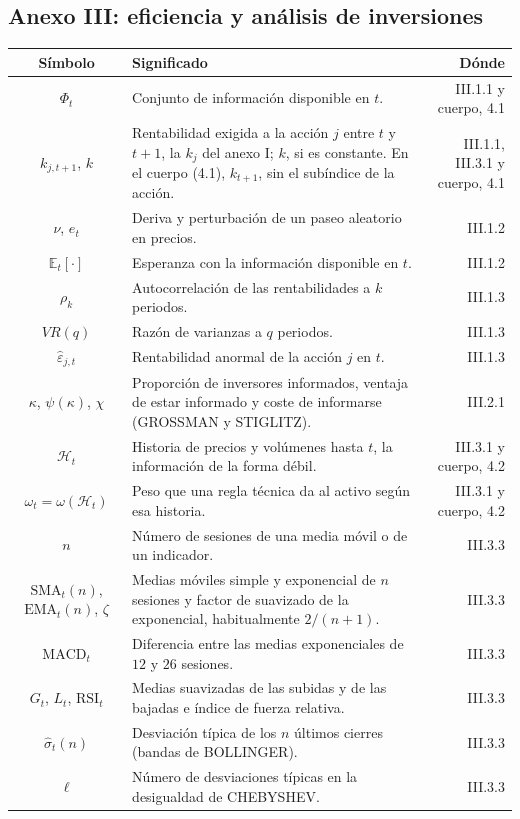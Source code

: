 \documentclass[10pt,a4paper]{article}
\newcommand{\cabecera}{\toprule\textbf{Símbolo} & \textbf{Significado} & \textbf{Dónde}\\\midrule\endhead\bottomrule\endfoot}
\begin{document}
\subsection*{Anexo III: eficiencia y análisis de inversiones}
\begin{longtable}{SMD}
\cabecera
$\Phi_t$ & Conjunto de información disponible en $t$. & III.1.1 y cuerpo, 4.1\\
$k_{j,t+1}$, $k$ & Rentabilidad exigida a la acción $j$ entre $t$ y $t+1$, la $k_j$ del anexo I; $k$, si es constante. En el cuerpo (4.1), $k_{t+1}$, sin el subíndice de la acción. & III.1.1, III.3.1 y cuerpo, 4.1\\
$\nu$, $e_t$ & Deriva y perturbación de un paseo aleatorio en precios. & III.1.2\\
$\mathbb E_t[\cdot]$ & Esperanza con la información disponible en $t$. & III.1.2\\
$\rho_k$ & Autocorrelación de las rentabilidades a $k$ periodos. & III.1.3\\
$VR(q)$ & Razón de varianzas a $q$ periodos. & III.1.3\\
$\hat\varepsilon_{j,t}$ & Rentabilidad anormal de la acción $j$ en $t$. & III.1.3\\
$\kappa$, $\psi(\kappa)$, $\chi$ & Proporción de inversores informados, ventaja de estar informado y coste de informarse (GROSSMAN y STIGLITZ). & III.2.1\\
$\mathcal H_t$ & Historia de precios y volúmenes hasta $t$, la información de la forma débil. & III.3.1 y cuerpo, 4.2\\
$\omega_t=\omega(\mathcal H_t)$ & Peso que una regla técnica da al activo según esa historia. & III.3.1 y cuerpo, 4.2\\
$n$ & Número de sesiones de una media móvil o de un indicador. & III.3.3\\
$\text{SMA}_t(n)$, $\text{EMA}_t(n)$, $\zeta$ & Medias móviles simple y exponencial de $n$ sesiones y factor de suavizado de la exponencial, habitualmente $2/(n+1)$. & III.3.3\\
$\text{MACD}_t$ & Diferencia entre las medias exponenciales de $12$ y $26$ sesiones. & III.3.3\\
$G_t$, $L_t$, $\text{RSI}_t$ & Medias suavizadas de las subidas y de las bajadas e índice de fuerza relativa. & III.3.3\\
$\hat\sigma_t(n)$ & Desviación típica de los $n$ últimos cierres (bandas de BOLLINGER). & III.3.3\\
$\ell$ & Número de desviaciones típicas en la desigualdad de CHEBYSHEV. & III.3.3\\

\end{longtable}
\end{document}
